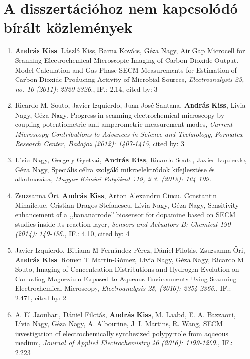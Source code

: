 \documentclass[11pt,a4paper,roman]{article}
\begin{document}
\section{A disszertációhoz nem kapcsolódó bírált közlemények}
\begin{enumerate}
\item \textbf{András Kiss}, László Kiss, Barna Kovács, Géza Nagy, Air Gap Microcell for Scanning Electrochemical Microscopic Imaging of Carbon Dioxide Output. Model Calculation and Gas Phase SECM Measurements for Estimation of Carbon Dioxide Producing Activity of Microbial Sources, \emph{Electroanalysis 23, no. 10 (2011): 2320-2326.}, IF.: 2.14, cited by: 3

\item Ricardo M. Souto, Javier Izquierdo, Juan José Santana, \textbf{András Kiss}, Lívia Nagy, Géza Nagy. Progress in scanning electrochemical microscopy by coupling potentiometric and amperometric measurement modes, \emph{Current Microscopy Contributions to Advances in Science and Technology, Formatex Research Center, Badajoz (2012): 1407-1415}, cited by: 3

\item Lívia Nagy, Gergely Gyetvai, \textbf{András Kiss}, Ricardo Souto, Javier Izquierdo, Géza Nagy, Speciális célra szolgáló mikroelektródok kifejlesztése és alkalmazása, \emph{Magyar Kémiai Folyóirat 119, 2-3. (2013): 104-109.}

\item Zsuzsanna \H{O}ri, \textbf{András Kiss}, Anton Alexandru Ciucu, Constantin Mihailciuc, Cristian Dragos Stefanescu, Lívia Nagy, Géza Nagy, Sensitivity enhancement of a ,,bananatrode'' biosensor for dopamine based on SECM studies inside its reaction layer, \emph{Sensors and Actuators B: Chemical 190 (2014): 149-156.}, IF.: 4.10, cited by: 4

\item Javier Izquierdo, Bibiana M Fernández-Pérez, Dániel Filotás, Zsuzsanna Őri, \textbf{András Kiss}, Romen T Martín-Gómez, Lívia Nagy, Géza Nagy, Ricardo M Souto, Imaging of Concentration Distributions and Hydrogen Evolution on Corroding Magnesium Exposed to Aqueous Environments Using Scanning Electrochemical Microscopy, \emph{Electroanalysis 28, (2016): 2354-2366.}, IF.: 2.471, cited by: 2

\item A. El Jaouhari,  Dániel Filotás, \textbf{András Kiss}, M. Laabd, E. A. Bazzaoui, Lívia Nagy, Géza Nagy, A. Albourine, J. I. Martins, R. Wang, SECM investigation of electrochemically synthesized polypyrrole from aqueous medium, \emph{Journal of Applied Electrochemistry 46 (2016): 1199-1209.}, IF.: 2.223

\end{enumerate}
\end{document}
